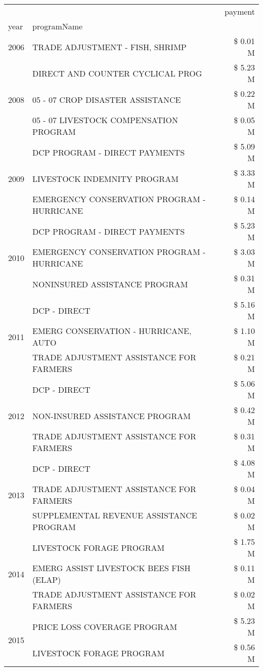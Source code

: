 \begin{tabular}{llr}
\toprule
 &  & payment \\
year & programName &  \\
\midrule
2006 & TRADE ADJUSTMENT - FISH, SHRIMP & \$ 0.01 M \\
\cline{1-3}
\multirow[t]{3}{*}{2008} & DIRECT AND COUNTER CYCLICAL PROG & \$ 5.23 M \\
 & 05 - 07 CROP DISASTER ASSISTANCE & \$ 0.22 M \\
 & 05 - 07 LIVESTOCK COMPENSATION PROGRAM & \$ 0.05 M \\
\cline{1-3}
\multirow[t]{3}{*}{2009} & DCP PROGRAM - DIRECT PAYMENTS & \$ 5.09 M \\
 & LIVESTOCK INDEMNITY PROGRAM & \$ 3.33 M \\
 & EMERGENCY CONSERVATION PROGRAM - HURRICANE & \$ 0.14 M \\
\cline{1-3}
\multirow[t]{3}{*}{2010} & DCP PROGRAM - DIRECT PAYMENTS & \$ 5.23 M \\
 & EMERGENCY CONSERVATION PROGRAM - HURRICANE & \$ 3.03 M \\
 & NONINSURED ASSISTANCE PROGRAM & \$ 0.31 M \\
\cline{1-3}
\multirow[t]{3}{*}{2011} & DCP - DIRECT & \$ 5.16 M \\
 & EMERG CONSERVATION - HURRICANE, AUTO & \$ 1.10 M \\
 & TRADE ADJUSTMENT ASSISTANCE FOR FARMERS & \$ 0.21 M \\
\cline{1-3}
\multirow[t]{3}{*}{2012} & DCP - DIRECT & \$ 5.06 M \\
 & NON-INSURED ASSISTANCE PROGRAM & \$ 0.42 M \\
 & TRADE ADJUSTMENT ASSISTANCE FOR FARMERS & \$ 0.31 M \\
\cline{1-3}
\multirow[t]{3}{*}{2013} & DCP - DIRECT & \$ 4.08 M \\
 & TRADE ADJUSTMENT ASSISTANCE FOR FARMERS & \$ 0.04 M \\
 & SUPPLEMENTAL REVENUE ASSISTANCE PROGRAM & \$ 0.02 M \\
\cline{1-3}
\multirow[t]{3}{*}{2014} & LIVESTOCK FORAGE PROGRAM & \$ 1.75 M \\
 & EMERG ASSIST LIVESTOCK BEES FISH (ELAP) & \$ 0.11 M \\
 & TRADE ADJUSTMENT ASSISTANCE FOR FARMERS & \$ 0.02 M \\
\cline{1-3}
\multirow[t]{3}{*}{2015} & PRICE LOSS COVERAGE PROGRAM & \$ 5.23 M \\
 & LIVESTOCK FORAGE PROGRAM & \$ 0.56 M \\

\end{tabular}
